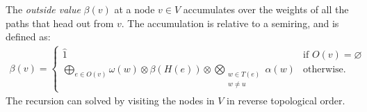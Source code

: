   \begin{definition}{} The \textit{outside value} $\beta(v)$ at a node $v \in V$ accumulates over the weights of all the paths that head out from $v$. The accumulation is relative to a semiring, and is defined as:
  \begin{align*}
    \beta(v) =
      \begin{cases}
        \hat{1}  & \mbox{if } O(v) = \varnothing \\
        \displaystyle\bigoplus_{e \in O(v)} \omega(w) \otimes \beta(H(e)) \otimes \displaystyle\bigotimes_{ \substack{ w \in T(e) \\ w \neq u } } \alpha(w)  & \mbox{otherwise.}
      \end{cases}
  \end{align*}
  The recursion can solved by visiting the nodes in $V$ in reverse topological order.
  \end{definition}



